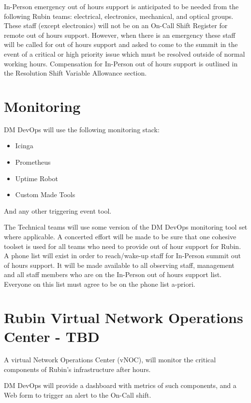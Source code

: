 In-Person emergency out of hours support is anticipated to be needed from the following Rubin teams:  electrical, electronics, mechanical, and optical groups.  These staff (except electronics) will not be on an On-Call Shift Register for remote out of hours support.  However, when there is an emergency these staff will be called for out of hours support and asked to come to the summit in the event of a critical or high priority issue which must be resolved outside of normal working hours.  Compensation for In-Person out of hours support is outlined in the Resolution Shift Variable Allowance section.

\section{Monitoring}

DM DevOps will use the following monitoring stack:

\begin{itemize}
    \item Icinga
    \item Prometheus
    \item Uptime Robot
    \item Custom Made Tools
\end{itemize}

And any other triggering event tool.

The Technical teams will use some version of the DM DevOps monitoring tool set where applicable.
A concerted effort will be made to be sure that one cohesive toolset is used for all teams who need to provide out of hour support for Rubin.
A phone list will exist in order to reach/wake-up staff for In-Person summit out of hours support.  It will be made available to all observing staff, management and all staff members who are on the In-Person out of hours support list.  Everyone on this list must agree to be on the phone list a-priori.

\section{Rubin Virtual Network Operations Center - TBD}

A virtual Network Operations Center (vNOC), will monitor the critical components of Rubin's infrastructure after hours.

DM DevOps will provide a dashboard with metrics of such components, and a Web form to trigger an alert to the On-Call shift.

